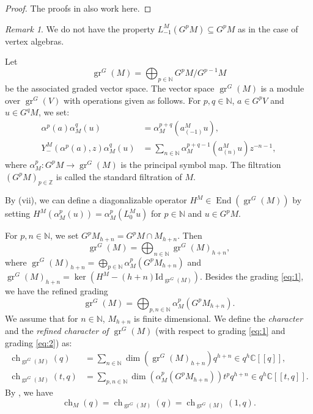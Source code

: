 \documentclass[a4paper, 12pt, reqno]{amsart}
\theoremstyle{remark}
\newtheorem{remark}[theorem]{Remark}
\DeclareMathOperator{\gr}{gr}
\DeclareMathOperator{\End}{End}
\DeclareMathOperator{\ch}{ch}
\newcommand{\Id}{{\mathrm{Id}}}
\begin{document}
\begin{proof}
  The proofs in \cite{li_vertex_2004} also work here.
\end{proof}

\begin{remark}
  \label{rmk:1}
  We do not have the property $L_{-1}^M(G^pM) \subseteq G^pM$ as in the case of vertex algebras.
\end{remark}

Let
\begin{equation*}
  \gr^G(M) = \bigoplus_{p \in \mathbb{N}}G^pM/G^{p - 1}M
\end{equation*}
be the associated graded vector space.
The vector space $\gr^G(M)$ is a module over $\gr^G(V)$ with operations given as follows.
For $p, q \in \mathbb{N}$, $a \in G^pV$ and $u \in G^qM$, we set:
\begin{align*}
  \alpha^p(a)\alpha_M^q(u) &= \alpha_M^{p + q}(a^M_{(-1)}u), \\
  Y^M_-(\alpha^p(a), z)\alpha_M^q(u) &= \sum_{n \in \mathbb{N}}\alpha_M^{p + q - 1}(a^M_{(n)}u)z^{-n - 1},
\end{align*}
where $\alpha_M^p: G^pM \to \gr^G(M)$ is the principal symbol map.
The filtration $(G^pM)_{p \in \mathbb{Z}}$ is called the standard filtration of $M$.

By (vii), we can define a diagonalizable operator $H^M \in \End(\gr^G(M))$ by setting $H^M(\alpha^p_M(u)) = \alpha^p_M(L^M_0u)$ for $p \in \mathbb{N}$ and $u \in G^pM$.

For $p, n \in \mathbb{N}$, we set $G^pM_{h + n} = G^pM \cap M_{h + n}$.
Then
\begin{equation}
  \label{eq:1}
  \gr^G(M) = \bigoplus_{n \in \mathbb{N}}\gr^G(M)_{h + n},
\end{equation}
where $\gr^G(M)_{h + n} = \bigoplus_{p \in \mathbb{N}}\alpha^p_M(G^pM_{h + n})$ and $\gr^G(M)_{h + n} = \ker(H^M - (h + n)\Id_{\gr^G(M)})$.
Besides the grading \eqref{eq:1}, we have the refined grading
\begin{equation}
  \label{eq:2}
  \gr^G(M) = \bigoplus_{p, n \in \mathbb{N}}\alpha^p_M(G^pM_{h + n}).
\end{equation}
We assume that for $n \in \mathbb{N}$, $M_{h + n}$ is finite dimensional.
We define the \emph{character} and the \emph{refined character of $\gr^G(M)$} (with respect to grading \eqref{eq:1} and grading \eqref{eq:2}) as:
\begin{align*}
  \ch_{\gr^G(M)}(q) &= \sum_{n \in \mathbb{N}}\dim(\gr^G(M)_{h + n})q^{h + n} \in q^h\mathbb{C}[[q]], \\
  \ch_{\gr^G(M)}(t, q) &= \sum_{p, n \in \mathbb{N}}\dim(\alpha^p_M(G^pM_{h + n}))t^pq^{h + n} \in q^{h}\mathbb{C}[[t, q]].
\end{align*}
By , we have
\begin{equation*}
  \ch_M(q) = \ch_{\gr^G(M)}(q) = \ch_{\gr^G(M)}(1, q).
\end{equation*}
\end{document}
